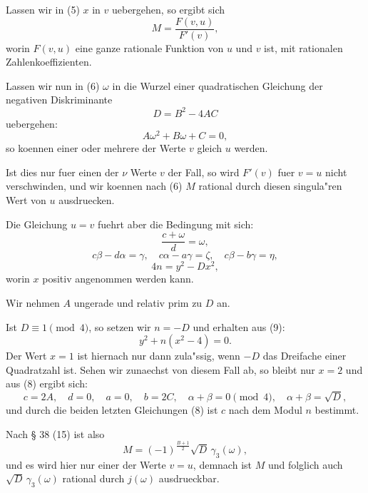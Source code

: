 \documentclass[12pt,a4paper]{article}
\theoremstyle{plain}
\theoremstyle{definition}
\theoremstyle{remark}
\begin{document}
Lassen wir in (5) $x$ in $v$ uebergehen, so ergibt sich
\[
M = \frac{F(v, u)}{F'(v)},
\]
worin $F(v, u)$ eine ganze rationale Funktion von $u$ und $v$ ist, mit rationalen Zahlenkoeffizienten.

Lassen wir nun in (6) $\omega$ in die Wurzel einer quadratischen Gleichung der negativen Diskriminante
\begin{equation}\label{eq:134_7}
D = B^2 - 4AC
\end{equation}
uebergehen:
\begin{equation}\label{eq:134_8}
A\omega^2 + B\omega + C = 0,
\end{equation}
so koennen einer oder mehrere der Werte $v$ gleich $u$ werden.

Ist dies nur fuer einen der $\nu$ Werte $v$ der Fall, so wird $F'(v)$ fuer $v = u$ nicht verschwinden, und wir koennen nach (6) $M$ rational durch diesen singula"ren Wert von $u$ ausdruecken.

Die Gleichung $u = v$ fuehrt aber die Bedingung mit sich:
\[
\frac{c + \omega}{d} = \omega,
\]
\begin{equation}\label{eq:134_9}
c\beta - d\alpha = \gamma, \quad c\alpha - a\gamma = \zeta, \quad c\beta - b\gamma = \eta,
\end{equation}
\begin{equation}\label{eq:134_10}
4n = y^2 - Dx^2,
\end{equation}
worin $x$ positiv angenommen werden kann.

Wir nehmen $A$ ungerade und relativ prim zu $D$ an.

Ist $D \equiv 1 \pmod{4}$, so setzen wir $n = -D$ und erhalten aus (9):
\[
y^2 + n(x^2 - 4) = 0.
\]
Der Wert $x = 1$ ist hiernach nur dann zula"ssig, wenn $-D$ das Dreifache einer Quadratzahl ist. Sehen wir zunaechst von diesem Fall ab, so bleibt nur $x = 2$ und aus (8) ergibt sich:
\[
c = 2A, \quad d = 0, \quad a = 0, \quad b = 2C, \quad \alpha + \beta = 0 \pmod{4}, \quad \alpha + \beta = \sqrt{D},
\]
und durch die beiden letzten Gleichungen (8) ist $c$ nach dem Modul $n$ bestimmt.

\newpage

Nach \S{} 38 (15) ist also
\begin{equation}\label{eq:134_10b}
M = (-1)^{\frac{B+1}{2}} \sqrt{D}\, \gamma_3(\omega),
\end{equation}
und es wird hier nur einer der Werte $v = u$, demnach ist $M$ und folglich auch $\sqrt{D}\, \gamma_3(\omega)$ rational durch $j(\omega)$ ausdrueckbar.
\end{document}
